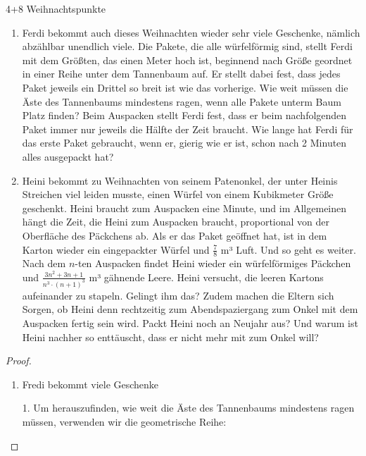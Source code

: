 \documentclass{problemset}
\begin{document}
\begin{problem}[Weihnachtsaufgaben*]{4+8 Weihnachtspunkte}
\begin{enumerate}
    \item Ferdi bekommt auch dieses Weihnachten wieder sehr viele Geschenke,
          nämlich abzählbar unendlich viele. Die Pakete, die alle würfelförmig
          sind, stellt Ferdi mit dem Größten, das einen Meter hoch ist,
          beginnend nach Größe geordnet in einer Reihe unter dem Tannenbaum
          auf. Er stellt dabei fest, dass jedes Paket jeweils ein Drittel so
          breit ist wie das vorherige. Wie weit müssen die Äste des Tannenbaums
          mindestens ragen, wenn alle Pakete unterm Baum Platz finden? Beim
          Auspacken stellt Ferdi fest, dass er beim nachfolgenden Paket immer
          nur jeweils die Hälfte der Zeit braucht. Wie lange hat Ferdi für das
          erste Paket gebraucht, wenn er, gierig wie er ist, schon nach 2
          Minuten alles ausgepackt hat?
    \item Heini bekommt zu Weihnachten von seinem Patenonkel, der unter Heinis
          Streichen viel leiden musste, einen Würfel von einem Kubikmeter Größe
          geschenkt. Heini braucht zum Auspacken eine Minute, und im
          Allgemeinen hängt die Zeit, die Heini zum Auspacken braucht,
          proportional von der Oberfläche des Päckchens ab. Als er das Paket
          geöffnet hat, ist in dem Karton wieder ein eingepackter Würfel und
          $\frac{7}{8}$ m³ Luft. Und so geht es weiter. Nach dem $n$-ten
          Auspacken findet Heini wieder ein würfelförmiges Päckchen und
          $\frac{3n^2+3n+1}{n^3\cdot(n+1)^3}$ m³ gähnende Leere. Heini
          versucht, die leeren Kartons aufeinander zu stapeln. Gelingt ihm das?
          Zudem machen die Eltern sich Sorgen, ob Heini denn rechtzeitig zum
          Abendspaziergang zum Onkel mit dem Auspacken fertig sein wird. Packt
          Heini noch an Neujahr aus? Und warum ist Heini nachher so enttäuscht,
          dass er nicht mehr mit zum Onkel will?
\end{enumerate}

\begin{proof}
    $ $

    \begin{enumerate}
        \item Fredi bekommt viele Geschenke

              1. Um herauszufinden, wie weit die Äste des Tannenbaums mindestens ragen müssen, verwenden wir die geometrische Reihe:


\end{enumerate}
\end{proof}
\end{problem}
\end{document}
